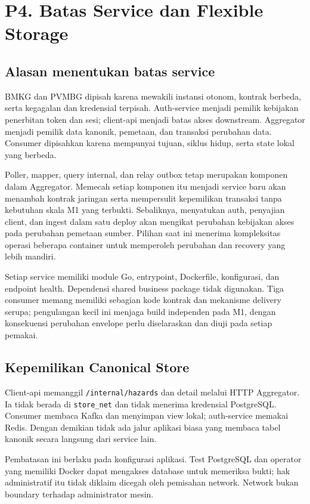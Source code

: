 \section{P4. Batas Service dan Flexible Storage}
\label{sec:p4}
\subsection{Alasan menentukan batas service}
BMKG dan PVMBG dipisah karena mewakili instansi otonom, kontrak berbeda, serta kegagalan dan kredensial terpisah. Auth-service menjadi pemilik kebijakan penerbitan token dan sesi; client-api menjadi batas akses downstream. Aggregator menjadi pemilik data kanonik, pemetaan, dan transaksi perubahan data. Consumer dipisahkan karena mempunyai tujuan, siklus hidup, serta state lokal yang berbeda.

Poller, mapper, query internal, dan relay outbox tetap merupakan komponen dalam Aggregator. Memecah setiap komponen itu menjadi service baru akan menambah kontrak jaringan serta mempersulit kepemilikan transaksi tanpa kebutuhan skala M1 yang terbukti. Sebaliknya, menyatukan auth, penyajian client, dan ingest dalam satu deploy akan mengikat perubahan kebijakan akses pada perubahan pemetaan sumber. Pilihan saat ini menerima kompleksitas operasi beberapa container untuk memperoleh perubahan dan recovery yang lebih mandiri.

Setiap service memiliki module Go, entrypoint, Dockerfile, konfigurasi, dan endpoint health. Dependensi shared business package tidak digunakan. Tiga consumer memang memiliki sebagian kode kontrak dan mekanisme delivery serupa; pengulangan kecil ini menjaga build independen pada M1, dengan konsekuensi perubahan envelope perlu diselaraskan dan diuji pada setiap pemakai.

\subsection{Kepemilikan Canonical Store}
Client-api memanggil \texttt{/internal/hazards} dan detail melalui HTTP Aggregator. Ia tidak berada di \texttt{store\_net} dan tidak menerima kredensial PostgreSQL. Consumer membaca Kafka dan menyimpan view lokal; auth-service memakai Redis. Dengan demikian tidak ada jalur aplikasi biasa yang membaca tabel kanonik secara langsung dari service lain.

Pembatasan ini berlaku pada konfigurasi aplikasi. Test PostgreSQL dan operator yang memiliki Docker dapat mengakses database untuk memeriksa bukti; hak administratif itu tidak diklaim dicegah oleh pemisahan network. Network bukan boundary terhadap administrator mesin.

